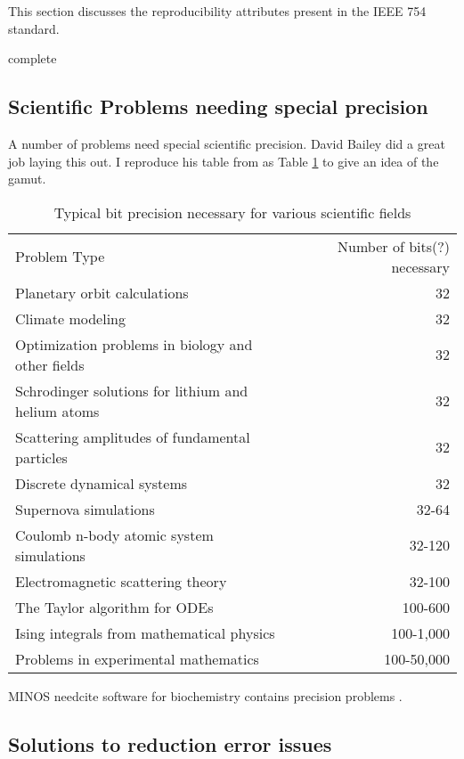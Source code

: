 \documentclass[american]{article}
\newcommand{\complete}{
	\gls{complete}
}
\newcommand{\needcite}{
	\gls{needcite}
}
\begin{document}
This section discusses the reproducibility attributes present in the IEEE 754 standard. \cite{ieee-754-2008}

\complete

\subsection{Scientific Problems needing special precision}

A number of problems need special scientific precision. David Bailey did a great job laying this out\cite{high-precision-arith-in-science,dhb-zurich-hp}. I reproduce his table from \cite{dhb-zurich-hp} as Table \ref{tab:precision} to give an idea of the gamut.

\FloatBarrier
\begin{table}[t]
\caption{Typical bit precision necessary for various scientific fields}\label{tab:precision}
\begin{tabular}{lr}
Problem Type & Number of bits(?) necessary \\
Planetary orbit calculations & 32 \\
Climate modeling & 32 \\
Optimization problems in biology and other fields & 32\\
Schrodinger solutions for lithium and helium atoms & 32\\
Scattering amplitudes of fundamental particles & 32\\
Discrete dynamical systems & 32\\
Supernova simulations & 32-64 \\
Coulomb n-body atomic system simulations & 32-120\\
Electromagnetic scattering theory & 32-100\\
The Taylor algorithm for ODEs & 100-600\\
Ising integrals from mathematical physics & 100-1,000\\
Problems in experimental mathematics & 100-50,000\\
\end{tabular}
\end{table}
\FloatBarrier

MINOS \needcite software for biochemistry contains precision problems \cite{dhb-zurich-hp}.

\subsection{Solutions to reduction error issues}
\end{document}
